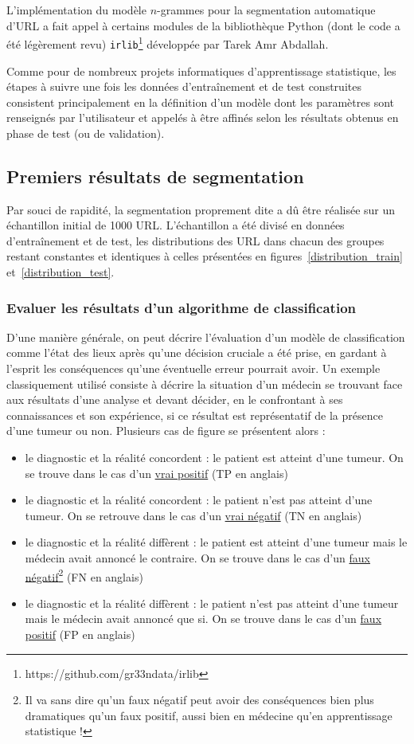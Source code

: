 \documentclass[11pt, a4paper]{article}
\begin{document}
L'implémentation du modèle $n$-grammes pour la segmentation automatique d'URL a fait appel à certains modules de la bibliothèque Python (dont le code a été légèrement revu) \texttt{irlib}\footnote{https://github.com/gr33ndata/irlib} développée par Tarek Amr Abdallah.

Comme pour de nombreux projets informatiques d'apprentissage statistique, les étapes à suivre une fois les données d'entraînement et de test construites consistent principalement en la définition d'un modèle dont les paramètres sont renseignés par l'utilisateur et appelés à être affinés selon les résultats obtenus en phase de test (ou de validation).

\subsection{Premiers résultats de segmentation}

Par souci de rapidité, la segmentation proprement dite a dû être réalisée sur un échantillon initial de 1000 URL. L'échantillon a été divisé en données d'entraînement et de test, les distributions des URL dans chacun des groupes restant constantes et identiques à celles présentées en figures~\ref{distribution_train} et~\ref{distribution_test}.

\subsubsection{Evaluer les résultats d'un algorithme de classification}

D'une manière générale, on peut décrire l'évaluation d'un modèle de classification comme l'état des lieux après qu'une décision cruciale a été prise, en gardant à l'esprit les conséquences qu'une éventuelle erreur pourrait avoir. Un exemple classiquement utilisé consiste à décrire la situation d'un médecin se trouvant face aux résultats d'une analyse et devant décider, en le confrontant à ses connaissances et son expérience, si ce résultat est représentatif de la présence d'une tumeur ou non. 
Plusieurs cas de figure se présentent alors :

\begin{itemize}
	\item le diagnostic et la réalité concordent : le patient est atteint d'une tumeur. On se trouve dans le cas d'un \underline{vrai positif} (TP en anglais)
	\item le diagnostic et la réalité concordent : le patient n'est pas atteint d'une tumeur. On se retrouve dans le cas d'un \underline{vrai négatif} (TN en anglais)
	\item le diagnostic et la réalité diffèrent : le patient est atteint d'une tumeur mais le médecin avait annoncé le contraire. On se trouve dans le cas d'un \underline{faux négatif}\footnote{Il va sans dire qu'un faux négatif peut avoir des conséquences bien plus dramatiques qu'un faux positif, aussi bien en médecine qu'en apprentissage statistique !} (FN en anglais)
	\item le diagnostic et la réalité diffèrent : le patient n'est pas atteint d'une tumeur mais le médecin avait annoncé que si. On se trouve dans le cas d'un \underline{faux positif} (FP en anglais)
\end{itemize}
\end{document}
